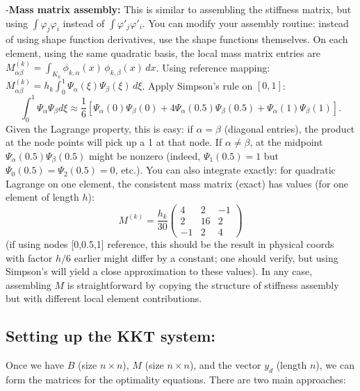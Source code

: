 \documentclass[a4paper,10pt]{article}
\begin{document}
-\textbf{Mass matrix assembly:} This is similar to assembling the stiffness matrix, but using \(\int \varphi_j \varphi_i\) instead of \(\int \varphi'_j \varphi'_i\). You can modify your assembly routine: instead of using shape function derivatives, use the shape functions themselves. On each element, using the same quadratic basis, the local mass matrix entries are \(M^{(k)}_{\alpha\beta} = \int_{K_k} \phi_{k,\alpha}(x)\,\phi_{k,\beta}(x)\,dx\). Using reference mapping: \(M^{(k)}_{\alpha\beta} = h_k \int_0^1 \Psi_\alpha(\xi)\Psi_\beta(\xi)\,d\xi\). Apply Simpson's rule on \([0,1]\):
\[\int_0^1 \Psi_\alpha \Psi_\beta d\xi \approx \frac{1}{6}[\Psi_\alpha(0)\Psi_\beta(0) + 4\Psi_\alpha(0.5)\Psi_\beta(0.5) + \Psi_\alpha(1)\Psi_\beta(1)].\]
Given the Lagrange property, this is easy: if \(\alpha=\beta\) (diagonal entries), the product at the node points will pick up a 1 at that node. If \(\alpha \neq \beta\), at the midpoint \(\Psi_\alpha(0.5)\Psi_\beta(0.5)\) might be nonzero (indeed, \(\Psi_1(0.5)=1\) but \(\Psi_0(0.5)=\Psi_2(0.5)=0\), etc.). You can also integrate exactly: for quadratic Lagrange on one element, the consistent mass matrix (exact) has values (for one element of length \(h\)):
$$M^{(k)} = \frac{h_k}{30}
	\begin{pmatrix}
		4  & 2  & -1 \\
		2  & 16 & 2  \\
		-1 & 2  & 4
	\end{pmatrix}$$
(if using nodes [0,0.5,1] reference, this should be the result in physical coords with factor \(h/6\) earlier might differ by a constant; one should verify, but using Simpson's will yield a close approximation to these values). In any case, assembling \(M\) is straightforward by copying the structure of stiffness assembly but with different local element contributions.

\subsection{Setting up the KKT system:} Once we have \(B\) (size \(n\times n\)), \(M\) (size \(n\times n\)), and the vector \(y_d\) (length \(n\)), we can form the matrices for the optimality equations. There are two main approaches:
\end{document}
